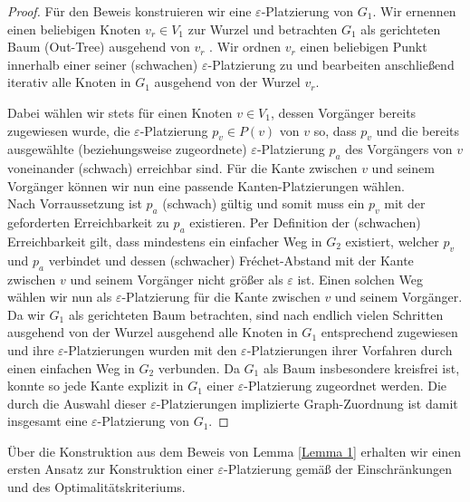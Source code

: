 \documentclass[a4paper, 12pt, twoside]{article}
\theoremstyle{Format1} %
\begin{document}
\begin{proof}
Für den Beweis konstruieren wir eine $\varepsilon$-Platzierung von $G_1$.
Wir ernennen einen beliebigen Knoten $v_r \in V_1$ zur Wurzel und betrachten $G_1$ als gerichteten Baum (Out-Tree) ausgehend von $v_r$ .
Wir ordnen $v_r$ einen beliebigen Punkt innerhalb einer seiner (schwachen) $\varepsilon$-Platzierung zu und bearbeiten anschließend iterativ alle
Knoten in $G_1$ ausgehend von der Wurzel $v_r$.

Dabei wählen wir stets für einen Knoten $v \in V_1$, dessen Vorgänger bereits zugewiesen wurde,
die $\varepsilon$-Platzierung $p_v \in P(v)$ von $v$ so, dass $p_v$
und die bereits ausgewählte (beziehungsweise zugeordnete) $\varepsilon$-Platzierung $p_a$ des Vorgängers von $v$ voneinander (schwach) erreichbar sind.
Für die Kante zwischen $v$ und seinem Vorgänger können wir nun eine passende Kanten-Platzierungen wählen.
\\
Nach Vorraussetzung ist $p_a$ (schwach) gültig und somit muss ein $p_v$ mit der geforderten Erreichbarkeit zu $p_a$ existieren.
Per Definition der (schwachen) Erreichbarkeit gilt, dass mindestens ein einfacher Weg in $G_2$ existiert, welcher $p_v$ und $p_a$ verbindet
und dessen (schwacher) Fréchet-Abstand mit der Kante zwischen $v$ und seinem Vorgänger nicht größer als $\varepsilon$ ist.
Einen solchen Weg wählen wir nun als $\varepsilon$-Platzierung für die Kante zwischen $v$ und seinem Vorgänger.
\\
Da wir $G_1$ als gerichteten Baum betrachten, sind nach endlich vielen Schritten ausgehend von der Wurzel ausgehend alle Knoten in $G_1$
entsprechend zugewiesen und ihre $\varepsilon$-Platzierungen
wurden mit den $\varepsilon$-Platzierungen ihrer Vorfahren durch einen einfachen Weg in $G_2$ verbunden.
Da $G_1$ als Baum insbesondere kreisfrei ist, konnte so jede Kante explizit in $G_1$ einer $\varepsilon$-Platzierung zugeordnet werden.
Die durch die Auswahl dieser $\varepsilon$-Platzierungen implizierte Graph-Zuordnung ist damit insgesamt eine $\varepsilon$-Platzierung von $G_1$.
\end{proof}

Über die Konstruktion aus dem Beweis von Lemma \ref{Lemma 1} erhalten wir einen ersten Ansatz zur Konstruktion einer $\varepsilon$-Platzierung gemäß der Einschränkungen und
des Optimalitätskriteriums.
\end{document}
